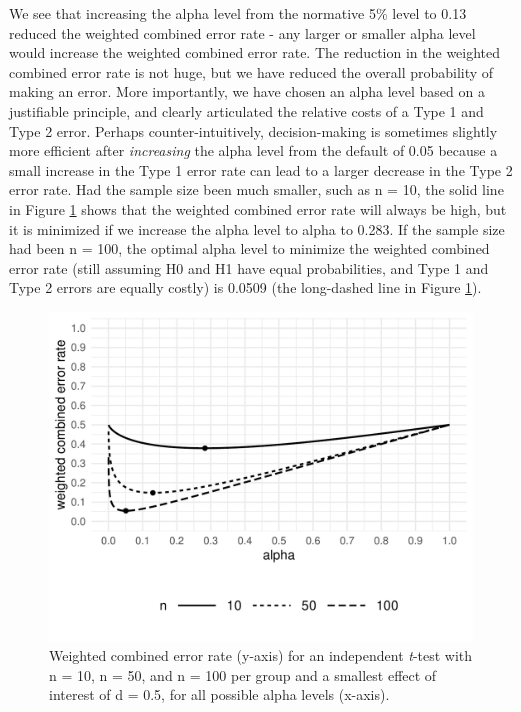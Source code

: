 \documentclass[
  english,
  ,man, a4paper,floatsintext]{apa6}
\begin{document}
We see that increasing the alpha level from the normative 5\% level to 0.13 reduced the weighted combined error rate - any larger or smaller alpha level would increase the weighted combined error rate. The reduction in the weighted combined error rate is not huge, but we have reduced the overall probability of making an error. More importantly, we have chosen an alpha level based on a justifiable principle, and clearly articulated the relative costs of a Type 1 and Type 2 error. Perhaps counter-intuitively, decision-making is sometimes slightly more efficient after \emph{increasing} the alpha level from the default of 0.05 because a small increase in the Type 1 error rate can lead to a larger decrease in the Type 2 error rate. Had the sample size been much smaller, such as n = 10, the solid line in Figure \ref{fig:weight-plot} shows that the weighted combined error rate will always be high, but it is minimized if we increase the alpha level to alpha to 0.283. If the sample size had been n = 100, the optimal alpha level to minimize the weighted combined error rate (still assuming H0 and H1 have equal probabilities, and Type 1 and Type 2 errors are equally costly) is 0.0509 (the long-dashed line in Figure \ref{fig:weight-plot}).

\begin{figure}
\centering
\includegraphics{Justify_in_Practice_files/figure-latex/weight-plot-1.pdf}
\caption{\label{fig:weight-plot}Weighted combined error rate (y-axis) for an independent \emph{t}-test with n = 10, n = 50, and n = 100 per group and a smallest effect of interest of d = 0.5, for all possible alpha levels (x-axis).}
\end{figure}
\end{document}
